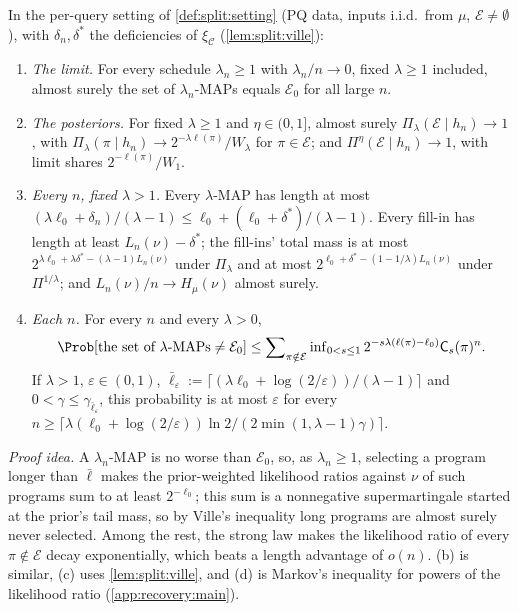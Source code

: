 \begin{theorem}\label{thm:recovery:main}
In the per-query setting of \cref{def:split:setting} (PQ data, inputs i.i.d.\ from $\mu$, $\mathcal E\ne\emptyset$), with $\delta_n,\delta^*$ the deficiencies of $\xi_{\mathcal C}$ (\cref{lem:split:ville}):
\begin{enumerate}[label=(\alph*),itemsep=0pt,topsep=2pt]
\item \emph{The limit.} For every schedule $\lambda_n\ge1$ with $\lambda_n/n\to0$, fixed $\lambda\ge1$ included, almost surely the set of $\lambda_n$-MAPs equals $\mathcal E_0$ for all large $n$.
\item \emph{The posteriors.} For fixed $\lambda\ge1$ and $\eta\in(0,1]$, almost surely $\Pi_\lambda(\mathcal E\mid h_n)\to1$, with $\Pi_\lambda(\pi\mid h_n)\to2^{-\lambda\ell(\pi)}/W_\lambda$ for $\pi\in\mathcal E$; and $\Pi^\eta(\mathcal E\mid h_n)\to1$, with limit shares $2^{-\ell(\pi)}/W_1$.
\item \emph{Every $n$, fixed $\lambda>1$.} Every $\lambda$-MAP has length at most $(\lambda\ell_0+\delta_n)/(\lambda-1)\le\ell_0+(\ell_0+\delta^*)/(\lambda-1)$. Every fill-in has length at least $L_n(\nu)-\delta^*$; the fill-ins' total mass is at most $2^{\lambda\ell_0+\lambda\delta^*-(\lambda-1)L_n(\nu)}$ under $\Pi_\lambda$ and at most $2^{\ell_0+\delta^*-(1-1/\lambda)L_n(\nu)}$ under $\Pi^{1/\lambda}$; and $L_n(\nu)/n\to H_\mu(\nu)$ almost surely.
\item \emph{Each $n$.} For every $n$ and every $\lambda>0$,
\[
\Prob[\text{the set of $\lambda$-MAPs}\ne\mathcal E_0]\le\sum\nolimits_{\pi\notin\mathcal E}\inf\nolimits_{0<s\le1}2^{-s\lambda(\ell(\pi)-\ell_0)}\mathsf C_s(\pi)^n .
\]
If $\lambda>1$, $\varepsilon\in(0,1)$, $\bar\ell_\varepsilon:=\lceil(\lambda\ell_0+\log(2/\varepsilon))/(\lambda-1)\rceil$ and $0<\gamma\le\gamma_{\bar\ell_\varepsilon}$, this probability is at most $\varepsilon$ for every $n\ge\big\lceil\lambda(\ell_0+\log(2/\varepsilon))\ln2/(2\min(1,\lambda-1)\gamma)\big\rceil$.
\end{enumerate}
\end{theorem}

\emph{Proof idea.} A $\lambda_n$-MAP is no worse than $\mathcal E_0$, so, as $\lambda_n\ge1$, selecting a program longer than $\bar\ell$ makes the prior-weighted likelihood ratios against $\nu$ of such programs sum to at least $2^{-\ell_0}$; this sum is a nonnegative supermartingale started at the prior's tail mass, so by Ville's inequality long programs are almost surely never selected. Among the rest, the strong law makes the likelihood ratio of every $\pi\notin\mathcal E$ decay exponentially, which beats a length advantage of $o(n)$. (b) is similar, (c) uses \cref{lem:split:ville}, and (d) is Markov's inequality for powers of the likelihood ratio (\cref{app:recovery:main}).


